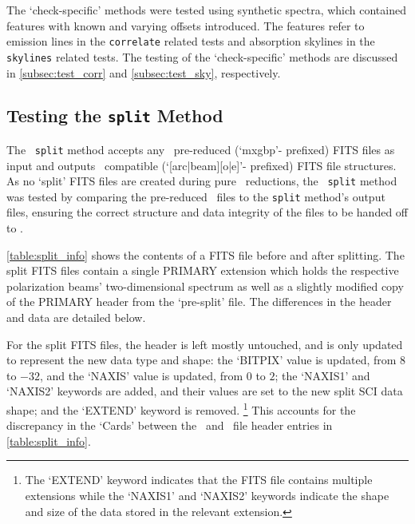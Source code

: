 The `check-specific' methods were tested using synthetic spectra, which contained features with known and varying offsets introduced.
The features refer to emission lines in the \texttt{correlate} related tests and absorption skylines in the \texttt{skylines} related tests.
The testing of the `check-specific' methods are discussed in \autoref{subsec:test_corr} and \autoref{subsec:test_sky}, respectively.

\subsection{Testing the \texttt{split} Method} \label{subsec:test_split}

The \stops\ \texttt{split} method accepts any \polsalt\ pre-reduced (`mxgbp'- prefixed) \gls{FITS} files as input and outputs \iraf\ compatible (`[arc|beam][o|e]'- prefixed) \gls{FITS} file structures.
As no `split' \gls{FITS} files are created during pure \polsalt\ reductions, the \stops\ \texttt{split} method was tested by comparing the pre-reduced \polsalt\ files to the \texttt{split} method's output files, ensuring the correct structure and data integrity of the files to be handed off to \iraf.



\autoref{table:split_info} shows the contents of a \gls{FITS} file before and after splitting.
The split \gls{FITS} files contain a single \gls{PRIMARY} extension which holds the respective polarization beams' two-dimensional spectrum as well as a slightly modified copy of the \gls{PRIMARY} header from the `pre-split' file. The differences in the header and data are detailed below.

For the split \gls{FITS} files, the header is left mostly untouched, and is only updated to represent the new data type and shape:
the `BITPIX' value is updated, from $8$ to $-32$, and the `NAXIS' value is updated, from $0$ to $2$;
the `NAXIS1' and `NAXIS2' keywords are added, and their values are set to the new split \gls{SCI} data shape;
and the `EXTEND' keyword is removed.%
\footnote{The `EXTEND' keyword indicates that the \gls{FITS} file contains multiple extensions while the `NAXIS1' and `NAXIS2' keywords indicate the shape and size of the data stored in the relevant extension.}
This accounts for the discrepancy in the `Cards' between the \polsalt\ and \stops\ file header entries in \autoref{table:split_info}.

